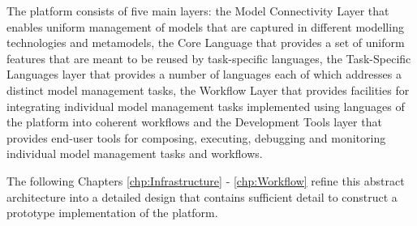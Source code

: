 The platform consists of five main layers: the Model Connectivity Layer that enables uniform management of models that are captured in different modelling technologies and metamodels, the Core Language that provides a set of uniform features that are meant to be reused by task-specific languages, the Task-Specific Languages layer that provides a number of languages each of which addresses a distinct model management tasks, the Workflow Layer that provides facilities for integrating individual model management tasks implemented using languages of the platform into coherent workflows and the Development Tools layer that provides end-user tools for composing, executing, debugging and monitoring individual model management tasks and workflows.

The following Chapters \ref{chp:Infrastructure} - \ref{chp:Workflow} refine this abstract architecture into a detailed design that contains sufficient detail to construct a prototype implementation of the platform. 